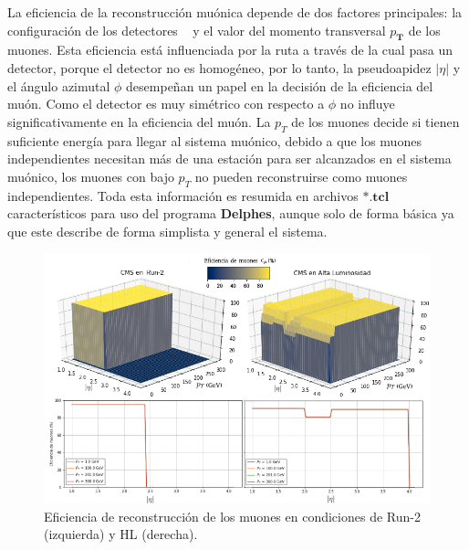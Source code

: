 La eficiencia de la reconstrucción muónica depende de dos factores principales: la configuración de los detectores \CMS ~ y el valor del  momento transversal $p_\mathbf{T}$ de los muones. Esta eficiencia está influenciada por la ruta a través de la cual pasa un detector, porque el detector no es homogéneo, por lo tanto, la pseudoapidez $|\eta|$ y el ángulo azimutal $\phi$ desempeñan un papel en la decisión de la eficiencia del muón. Como el detector es muy simétrico con respecto a $\phi$ no influye significativamente en la eficiencia del muón. La $p_T$ de los muones decide si tienen suficiente energía para llegar al sistema muónico, debido a que los muones independientes necesitan más de una estación para ser alcanzados en el sistema muónico, los muones con bajo $p_T$ no pueden reconstruirse como muones independientes. Toda esta información es resumida en archivos $\mathbf{*.tcl}$ característicos para uso del programa \textbf{Delphes}, aunque solo de forma básica ya que este describe de forma simplista y general el sistema.

\begin{figure}[!t]
\centering
\includegraphics[width=1\textwidth]{Cap2/imagenes/Eficiencia_of_Muon.png}
\caption{Eficiencia de reconstrucción de los muones %
en condiciones de Run-2 (izquierda) y HL (derecha).}
\label{Compara_eficiencia_muon}
\end{figure}











